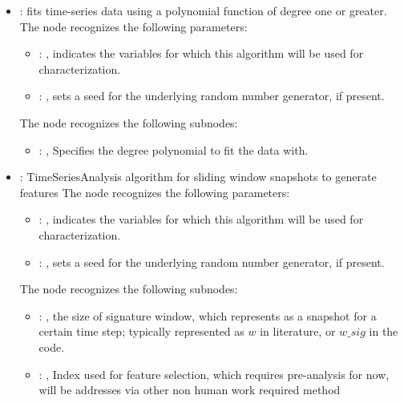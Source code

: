 \begin{itemize}
    \item {}:
      fits time-series data using a polynomial function of degree one or greater.
      The  node recognizes the following parameters:
        \begin{itemize}
          \item {}: , 
            indicates the variables for which this algorithm will be used for characterization.
          \item {}: , 
            sets a seed for the underlying random number generator, if present.
      \end{itemize}

      The  node recognizes the following subnodes:
      \begin{itemize}
        \item {}: , 
          Specifies the degree polynomial to fit the data with.
      \end{itemize}

    \item {}:
      TimeSeriesAnalysis algorithm for sliding window snapshots to generate features
      The  node recognizes the following parameters:
        \begin{itemize}
          \item {}: , 
            indicates the variables for which this algorithm will be used for characterization.
          \item {}: , 
            sets a seed for the underlying random number generator, if present.
      \end{itemize}

      The  node recognizes the following subnodes:
      \begin{itemize}
        \item {}: , 
          the size of signature window, which represents as a snapshot for a certain time step;
          typically represented as $w$ in literature, or $w\_sig$ in the code.

        \item {}: , 
          Index used for feature selection, which requires pre-analysis for now, will be addresses
          via other non human work required method


\end{itemize}
\end{itemize}

